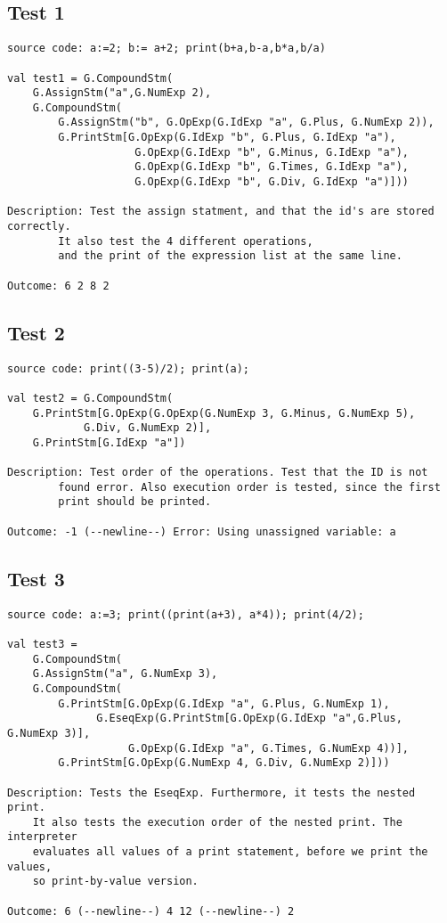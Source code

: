 \documentclass[a4paper]{article}
\begin{document}
\subsection{Test 1}
\begin{lstlisting}
source code: a:=2; b:= a+2; print(b+a,b-a,b*a,b/a)

val test1 = G.CompoundStm(
	G.AssignStm("a",G.NumExp 2),
	G.CompoundStm(
	    G.AssignStm("b", G.OpExp(G.IdExp "a", G.Plus, G.NumExp 2)),
	    G.PrintStm[G.OpExp(G.IdExp "b", G.Plus, G.IdExp "a"),
	    			G.OpExp(G.IdExp "b", G.Minus, G.IdExp "a"),
	    			G.OpExp(G.IdExp "b", G.Times, G.IdExp "a"),
	    			G.OpExp(G.IdExp "b", G.Div, G.IdExp "a")]))

Description: Test the assign statment, and that the id's are stored correctly.
		It also test the 4 different operations, 
		and the print of the expression list at the same line.

Outcome: 6 2 8 2
\end{lstlisting}

\subsection{Test 2}
\begin{lstlisting}
source code: print((3-5)/2); print(a);

val test2 = G.CompoundStm(
	G.PrintStm[G.OpExp(G.OpExp(G.NumExp 3, G.Minus, G.NumExp 5),
			G.Div, G.NumExp 2)],
	G.PrintStm[G.IdExp "a"])

Description: Test order of the operations. Test that the ID is not
		found error. Also execution order is tested, since the first 
		print should be printed.

Outcome: -1 (--newline--) Error: Using unassigned variable: a
\end{lstlisting}

\subsection{Test 3}
\begin{lstlisting}
source code: a:=3; print((print(a+3), a*4)); print(4/2);

val test3 = 
    G.CompoundStm(
	G.AssignStm("a", G.NumExp 3),
	G.CompoundStm(
	    G.PrintStm[G.OpExp(G.IdExp "a", G.Plus, G.NumExp 1), 
		      G.EseqExp(G.PrintStm[G.OpExp(G.IdExp "a",G.Plus, G.NumExp 3)],
			       G.OpExp(G.IdExp "a", G.Times, G.NumExp 4))],
	    G.PrintStm[G.OpExp(G.NumExp 4, G.Div, G.NumExp 2)]))

Description: Tests the EseqExp. Furthermore, it tests the nested print.
	It also tests the execution order of the nested print. The interpreter
	evaluates all values of a print statement, before we print the values,
	so print-by-value version. 

Outcome: 6 (--newline--) 4 12 (--newline--) 2
\end{lstlisting}
\end{document}
